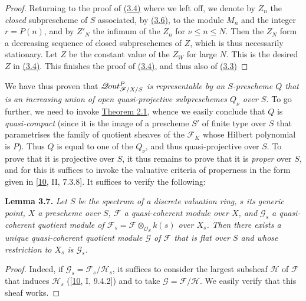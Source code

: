 \documentclass{article}
\newenvironment{itenv}[1]
  {\phantomsection\par\smallskip\noindent\textbf{#1.}\itshape}
  {\par\smallskip}
\newcommand{\oldpage}[1]{\marginpar{\footnotesize$\Big\vert$ \textit{p.~#1}}}
\theoremstyle{definition}
\theoremstyle{definition}
\theoremstyle{definition}
\theoremstyle{definition}
\theoremstyle{remark}
\begin{document}
\begin{proof}
Returning to the proof of \protect\hyperlink{fga-3-iv-lemma-3.4}{(3.4)} where we left off, we denote by \(Z_n\) the \emph{closed} subprescheme of \(S\) associated, by \protect\hyperlink{fga-3-iv-lemma-3.6}{(3.6)}, to the module \(M_n\) and the integer \(r=P(n)\), and by \(Z'_N\) the infimum of the \(Z_n\) for \(\nu\leqslant n\leqslant N\).
Then the \(Z_N\) form a decreasing sequence of closed subpreschemes of \(Z\), which is thus necessarily stationary.
Let \(Z\) be the constant value of the \(Z_W\) for large \(N\).
This is the desired \(Z\) in \protect\hyperlink{fga-3-iv-lemma-3.4}{(3.4)}.
This finishes the proof of \protect\hyperlink{fga-3-iv-lemma-3.4}{(3.4)}, and thus also of \protect\hyperlink{fga-3-iv-lemma-3.3}{(3.3)}
\end{proof}

We have thus proven that \emph{\(\mathscr{Q}\kern -.5pt out_{{{\mathscr{F}}/X/S}}^P\) is representable by an \(S\)-prescheme \(Q\) that is an increasing union of open quasi-projective subpreschemes \(Q_\nu\) over \(S\).}
To go further, we need to invoke \protect\hyperlink{fga-3-iv-theorem-2.1}{Theorem 2.1}, whence we easily conclude that \(Q\) is \emph{quasi-compact} (since it is the image of a prescheme \(S'\) of finite type over \(S\) that parametrises the family of quotient sheaves of the \({\mathscr{F}}_K\) whose Hilbert polynomial is \(P\)).
Thus \(Q\) is equal to one of the \(Q_\nu\), and thus quasi-projective over \(S\).
To prove that it is projective over \(S\), it thus remains to prove that it is \emph{proper} over \(S\), and for this it suffices to invoke the valuative criteria of properness in the form given in {[}\protect\hyperlink{ref-GD1960}{10}, II, 7.3.8{]}.
It suffices to verify the following:

\leavevmode{}%
\begin{itenv}{Lemma 3.7}
Let \(S\) be the spectrum of a discrete valuation ring, \(s\) its generic point, \(X\) a prescheme over \(S\), \({\mathscr{F}}\) a quasi-coherent module over \(X\), and \({\mathscr{G}}_s\) a quasi-coherent quotient module of \({\mathscr{F}}_s={\mathscr{F}}\otimes_{{\mathscr{O}}_S}k(s)\) over \(X_s\).
Then there exists a unique quasi-coherent quotient module \({\mathscr{G}}\) of \({\mathscr{F}}\) that is flat over \(S\) and whose restriction to \(X_s\) is \({\mathscr{G}}_s\).

\end{itenv}

\begin{proof}
\oldpage{221-17}Indeed, if \({\mathscr{G}}_s={\mathscr{F}}_s/{\mathscr{H}}_s\), it suffices to consider the largest subsheaf \({\mathscr{H}}\) of \({\mathscr{F}}\) that induces \({\mathscr{H}}_s\) ({[}\protect\hyperlink{ref-GD1960}{10}, I, 9.4.2{]}) and to take \({\mathscr{G}}={\mathscr{F}}/{\mathscr{H}}\).
We easily verify that this sheaf works.
\end{proof}
\end{document}
